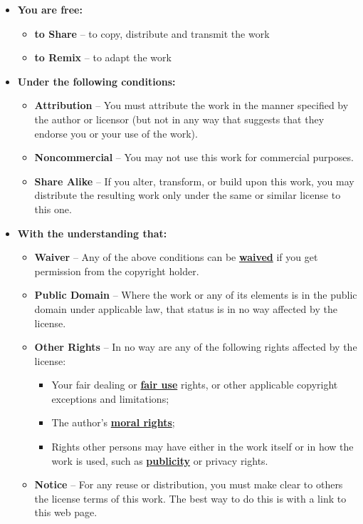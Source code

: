 \documentclass[12pt,letterpaper,oneside,final]{memoir}
\begin{document}
\begin{appendices}
\begin{itemize}
\item \textbf{You are free:}
   \begin{itemize}
   \item \textbf{to Share} -- to copy, distribute and transmit the work
   \item \textbf{to Remix} -- to adapt the work
   \end{itemize}
\item \textbf{Under the following conditions:}
   \begin{itemize}
   \item \textbf{Attribution} -- You must attribute the work in the manner specified by the author or licensor (but not in any way that suggests that they endorse you or your use of the work). 
   \item \textbf{Noncommercial} -- You may not use this work for commercial purposes. 
   \item \textbf{Share Alike} -- If you alter, transform, or build upon this work, you may distribute the resulting work only under the same or similar license to this one. 
   \end{itemize}  
\item \textbf{With the understanding that:}
   \begin{itemize}
   \item \textbf{Waiver} -- Any of the above conditions can be \textbf{\underline{waived}} if you get permission from the copyright holder.
   \item \textbf{Public Domain} -- Where the work or any of its elements is in the public domain under applicable law, that status is in no way affected by the license. 
   \item \textbf{Other Rights} -- In no way are any of the following rights affected by the license: 
      \begin{itemize}
      \item Your fair dealing or \textbf{\underline{fair use}} rights, or other applicable copyright exceptions and limitations;
      \item The author's \textbf{\underline{moral rights}};
      \item Rights other persons may have either in the work itself or in how the work is used, such as \textbf{\underline{publicity}} or privacy rights.
      \end{itemize}
   \item \textbf{Notice} -- For any reuse or distribution, you must make clear to others the license terms of this work. The best way to do this is with a link to this web page. 
   \end{itemize}  
\end{itemize}


\end{appendices}
\end{document}
